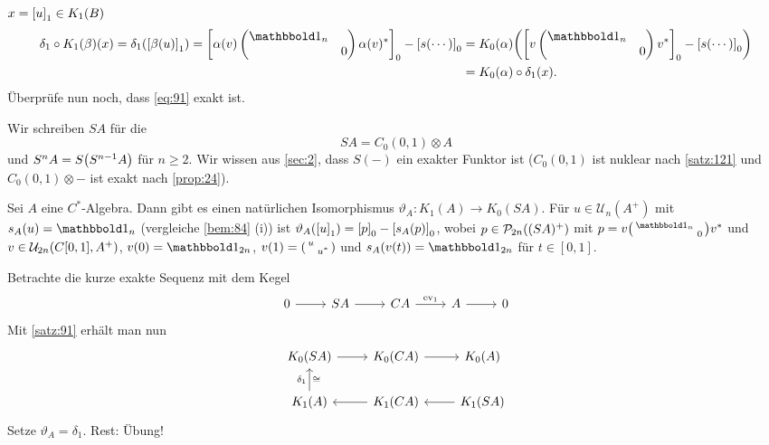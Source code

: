 \begin{beweis}[Idee]
	$x= \benbrace*{u}_1 \in K_1(B)$
	\begin{align}
		\delta_1 \circ K_1(\beta)(x) = \delta_1 \enbrace*{\benbrace*{\beta(u)}_1} = \benbrace*{\alpha(v) \begin{pmatrix}
			\ind_n & \\ & 0
		\end{pmatrix} \alpha(v)^*}_0 - \benbrace*{s(\cdots)}_0 &= K_0(\alpha) \enbrace*{\benbrace*{v \begin{pmatrix}
			\ind_n & \\ & 0
		\end{pmatrix} v^*}_0 - \benbrace*{s(\cdots)}_0} \\
		&= K_0(\alpha) \circ \delta_1(x).
	\end{align}
	Überprüfe nun noch, dass \eqref{eq:91} exakt ist.
\end{beweis}

Wir schreiben $SA$ für die 
\[
	SA = C_0(0,1) \otimes A
\]
und $S^n A = S \enbrace*{S^{n-1}A}$ für $n \ge 2$.
Wir wissen aus \cref{sec:2}, dass $S(-)$ ein exakter Funktor ist ($C_0(0,1)$ ist nuklear nach \autoref{satz:121} und $C_0(0,1) \otimes -$ ist exakt nach \autoref{prop:24}). 

\begin{satz}[label=satz:92]
	Sei $A$ eine $C^*$-Algebra.
	Dann gibt es einen natürlichen Isomorphismus $\vartheta_A \colon K_1(A) \to K_0(SA)$.
	Für $u \in \mathcal{U}_n(A^+)$ mit $s_A(u)= \ind_n$ (vergleiche \autoref{bem:84} (i)) ist $\vartheta_A \enbrace*{\benbrace*{u}_1} = \benbrace*{p}_0 - \benbrace*{s_A(p)}_0$, wobei $p \in \kernedP_{2n} \enbrace*{(SA)^+}$ mit $p = v\begin{psmallmatrix} \ind_n & \\ & 0 \end{psmallmatrix} v^*$ und $v \in \mathcal{U}_{2n} \enbrace*{C[0,1], A^+}$, $v(0)= \ind_{2n}$, $v(1) = \begin{psmallmatrix} u & \\ & u^* \end{psmallmatrix}$ und $s_A(v(t)) = \ind_{2n}$ für $t \in [0,1]$.
\end{satz}
\begin{beweis}
	Betrachte die kurze exakte Sequenz mit dem Kegel
	\[
		\begin{tikzcd}
			0 \rar & SA \rar & CA \rar["\ev_1"] & A \rar & 0
		\end{tikzcd}
	\]
	Mit \autoref{satz:91} erhält man nun
	\[
		\begin{tikzcd}
			K_0(SA) \rar & K_0(CA) \rar & K_0(A) \\
			K_1(A) \uar["\delta_1","\cong"'] & K_1(CA) \lar & K_1(SA) \lar
		\end{tikzcd}
	\]
	Setze $\vartheta_A = \delta_1$. Rest: Übung!
\end{beweis}

